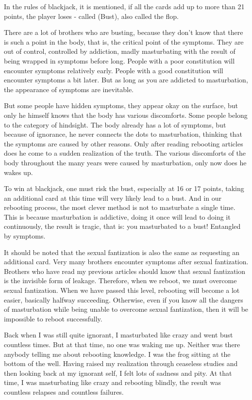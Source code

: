 \documentclass[
]{book}
\begin{document}
In the rules of blackjack, it is mentioned, if all the cards add up to more than 21 points, the player loses - called (Bust), also called the flop.

There are a lot of brothers who are busting, because they don't know that there is such a point in the body, that is, the critical point of the symptoms. They are out of control, controlled by addiction, madly masturbating with the result of being wrapped in symptoms before long. People with a poor constitution will encounter symptoms relatively early. People with a good constitution will encounter symptoms a bit later. But as long as you are addicted to masturbation, the appearance of symptoms are inevitable.

But some people have hidden symptoms, they appear okay on the surface, but only he himself knows that the body has various discomforts. Some people belong to the category of hindsight. The body already has a lot of symptoms, but because of ignorance, he never connects the dots to masturbation, thinking that the symptoms are caused by other reasons. Only after reading rebooting articles does he come to a sudden realization of the truth. The various discomforts of the body throughout the many years were caused by masturbation, only now does he wakes up.

To win at blackjack, one must risk the bust, especially at 16 or 17 points, taking an additional card at this time will very likely lead to a bust. And in our rebooting process, the most clever method is not to masturbate a single time. This is because masturbation is addictive, doing it once will lead to doing it continuously, the result is tragic, that is: you masturbated to a bust! Entangled by symptoms.

It should be noted that the sexual fantization is also the same as requesting an additional card. Very many brothers encounter symptoms after sexual fantization. Brothers who have read my previous articles should know that sexual fantization is the invisible form of leakage. Therefore, when we reboot, we must overcome sexual fantization. When we have passed this level, rebooting will become a lot easier, basically halfway succeeding. Otherwise, even if you know all the dangers of masturbation while being unable to overcome sexual fantization, then it will be impossible to reboot successfully.

Back when I was still quite ignorant, I masturbated like crazy and went bust countless times. But at that time, no one was waking me up. Neither was there anybody telling me about rebooting knowledge. I was the frog sitting at the bottom of the well. Having raised my realization through ceaseless studies and then looking back at my ignorant self, I felt lots of sadness and pity. At that time, I was masturbating like crazy and rebooting blindly, the result was countless relapses and countless failures.
\end{document}
